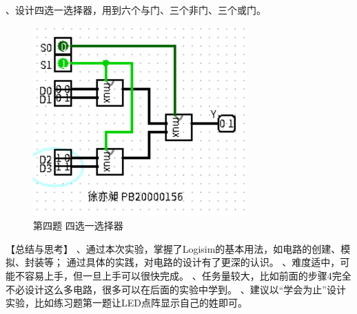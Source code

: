 \documentclass[UTF8]{ctexart}
\begin{document}
、设计四选一选择器，用到六个与门、三个非门、三个或门。
\begin{figure}[h!]
    \centering
    \includegraphics[scale=0.6]{p4.PNG}
    \caption{第四题 四选一选择器}
\end{figure}
\newline
【总结与思考】
、通过本次实验，掌握了Logisim的基本用法，如电路的创建、模拟、封装等；
通过具体的实践，对电路的设计有了更深的认识。
、难度适中，可能不容易上手，但一旦上手可以很快完成。
、任务量较大，比如前面的步骤4完全不必设计这么多电路，很多可以在后面的实验中学到。
、建议以“学会为止”设计实验，比如练习题第一题让LED点阵显示自己的姓即可。
\end{document}

